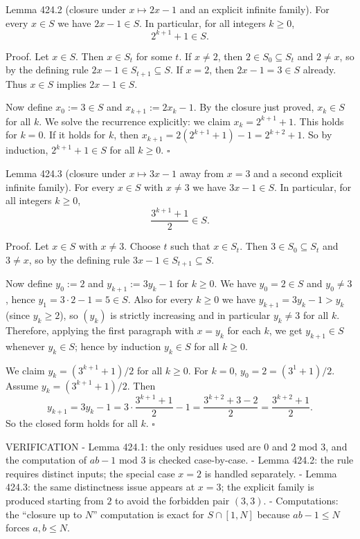 Lemma 424.2 (closure under $x\mapsto 2x-1$ and an explicit infinite family).
For every $x\in S$ we have $2x-1\in S$.
In particular, for all integers $k\ge 0$,
\[
2^{k+1}+1\in S.
\]

Proof.
Let $x\in S$. Then $x\in S_t$ for some $t$.
If $x\ne 2$, then $2\in S_0\subseteq S_t$ and $2\ne x$, so by the defining rule $2x-1\in S_{t+1}\subseteq S$.
If $x=2$, then $2x-1=3\in S$ already.
Thus $x\in S$ implies $2x-1\in S$.

Now define $x_0:=3\in S$ and $x_{k+1}:=2x_k-1$.
By the closure just proved, $x_k\in S$ for all $k$.
We solve the recurrence explicitly: we claim $x_k=2^{k+1}+1$.
This holds for $k=0$.
If it holds for $k$, then $x_{k+1}=2(2^{k+1}+1)-1=2^{k+2}+1$.
So by induction, $2^{k+1}+1\in S$ for all $k\ge 0$.
\hfill $\square$

Lemma 424.3 (closure under $x\mapsto 3x-1$ away from $x=3$ and a second explicit infinite family).
For every $x\in S$ with $x\ne 3$ we have $3x-1\in S$.
In particular, for all integers $k\ge 0$,
\[
\frac{3^{k+1}+1}{2}\in S.
\]

Proof.
Let $x\in S$ with $x\ne 3$. Choose $t$ such that $x\in S_t$. Then $3\in S_0\subseteq S_t$ and $3\ne x$, so by the defining rule $3x-1\in S_{t+1}\subseteq S$.

Now define $y_0:=2$ and $y_{k+1}:=3y_k-1$ for $k\ge 0$.
We have $y_0=2\in S$ and $y_0\ne 3$, hence $y_1=3\cdot 2-1=5\in S$.
Also for every $k\ge 0$ we have $y_{k+1}=3y_k-1>y_k$ (since $y_k\ge 2$), so $(y_k)$ is strictly increasing and in particular $y_k\ne 3$ for all $k$.
Therefore, applying the first paragraph with $x=y_k$ for each $k$, we get $y_{k+1}\in S$ whenever $y_k\in S$; hence by induction $y_k\in S$ for all $k\ge 0$.

We claim $y_k=(3^{k+1}+1)/2$ for all $k\ge 0$.
For $k=0$, $y_0=2=(3^{1}+1)/2$.
Assume $y_k=(3^{k+1}+1)/2$.
Then
\[
 y_{k+1}=3y_k-1 = 3\cdot\frac{3^{k+1}+1}{2}-1=\frac{3^{k+2}+3-2}{2}=\frac{3^{k+2}+1}{2}.
\]
So the closed form holds for all $k$.
\hfill $\square$


VERIFICATION
- Lemma 424.1: the only residues used are $0$ and $2$ mod $3$, and the computation of $ab-1$ mod $3$ is checked case-by-case.
- Lemma 424.2: the rule requires distinct inputs; the special case $x=2$ is handled separately.
- Lemma 424.3: the same distinctness issue appears at $x=3$; the explicit family is produced starting from $2$ to avoid the forbidden pair $(3,3)$.
- Computations: the “closure up to $N$” computation is exact for $S\cap[1,N]$ because $ab-1\le N$ forces $a,b\le N$.

